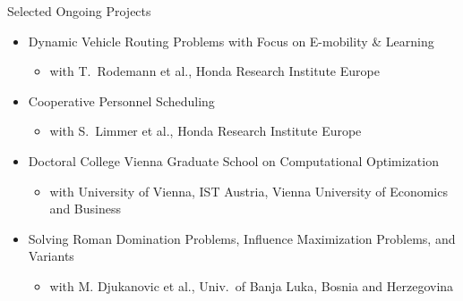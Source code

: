 \documentclass[aspectratio=1610]{beamer}
\begin{document}
\begin{frame}{Selected Ongoing Projects}
\begin{itemize}
  \itemsep3.5ex
  \item Dynamic Vehicle Routing Problems with Focus on E-mobility \& Learning
  \begin{itemize}
    \item with T.~Rodemann et al., Honda Research Institute Europe
  \end{itemize}
  \item Cooperative Personnel Scheduling
  \begin{itemize}
    \item with S.~Limmer et al., Honda Research Institute Europe
  \end{itemize}
  \item Doctoral College Vienna Graduate School on Computational Optimization
  \begin{itemize}
    \item with University of Vienna, IST Austria, Vienna University of Economics and Business
  \end{itemize}
  \item Solving Roman Domination Problems, Influence Maximization Problems, and Variants
  \begin{itemize}
    \item with M. Djukanovic et al., Univ.\ of Banja Luka, Bosnia and Herzegovina
  \end{itemize}
\end{itemize}
\end{frame}
\end{document}
